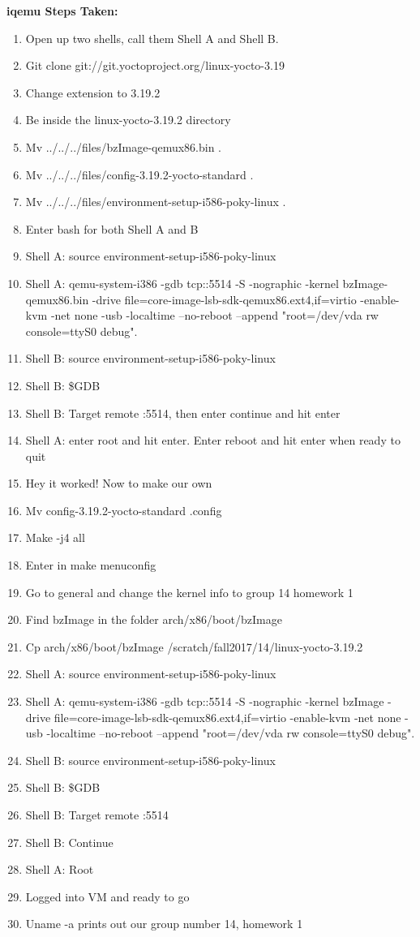 \documentclass[letterpaper,10pt,fleqn]{article}
\begin{document}
\textbf{iqemu Steps Taken:}
	\begin{enumerate}
	\item Open up two shells, call them Shell A and Shell B.
	\item Git clone git://git.yoctoproject.org/linux-yocto-3.19
	\item Change extension to 3.19.2
	\item Be inside the linux-yocto-3.19.2 directory
	\item Mv ../../../files/bzImage-qemux86.bin .
	\item Mv ../../../files/config-3.19.2-yocto-standard .
	\item Mv ../../../files/environment-setup-i586-poky-linux .
	\item Enter bash for both Shell A and B
	\item Shell A: source environment-setup-i586-poky-linux
	\item Shell A: qemu-system-i386 -gdb tcp::5514 -S -nographic -kernel bzImage-qemux86.bin -drive file=core-image-lsb-sdk-qemux86.ext4,if=virtio -enable-kvm -net none -usb -localtime --no-reboot --append "root=/dev/vda rw console=ttyS0 debug".
	\item Shell B: source environment-setup-i586-poky-linux
	\item Shell B: \$GDB
	\item Shell B: Target remote :5514, then enter continue and hit enter
	\item Shell A: enter root and hit enter. Enter reboot and hit enter when ready to quit
	\item Hey it worked! Now to make our own
	\item Mv config-3.19.2-yocto-standard .config
	\item Make -j4 all
	\item Enter in make menuconfig
	\item Go to general and change the kernel info to group 14 homework 1
	\item Find bzImage in the folder arch/x86/boot/bzImage
	\item Cp arch/x86/boot/bzImage /scratch/fall2017/14/linux-yocto-3.19.2
	\item Shell A: source environment-setup-i586-poky-linux
	\item Shell A: qemu-system-i386 -gdb tcp::5514 -S -nographic -kernel bzImage -drive file=core-image-lsb-sdk-qemux86.ext4,if=virtio -enable-kvm -net none -usb -localtime --no-reboot --append "root=/dev/vda rw console=ttyS0 debug".
	\item Shell B: source environment-setup-i586-poky-linux
	\item Shell B: \$GDB
	\item Shell B: Target remote :5514
	\item Shell B: Continue
	\item Shell A: Root
	\item Logged into VM and ready to go
	\item Uname -a prints out our group number 14, homework 1
\end{enumerate}
\end{document}
